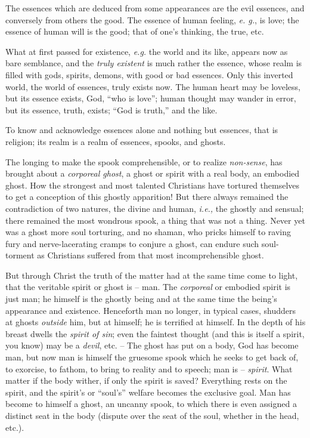 The essences which are deduced from some appearances are the evil essences, 
and conversely from others the good. The essence of human feeling, \textit{e. 
g.}, is love; the essence of human will is the good; that of one's thinking, 
the true, etc.

What at first passed for existence, \textit{e.g.} the world and its like, 
appears now as bare semblance, and the \textit{truly existent} is much rather 
the essence, whose realm is filled with gods, spirits, demons, with good or 
bad essences. Only this inverted world, the world of essences, truly exists 
now. The human heart may be loveless, but its essence exists, God, ``who is 
love''; human thought may wander in error, but its essence, truth, exists; 
``God is truth,'' and the like.

To know and acknowledge essences alone and nothing but essences, that is 
religion; its realm is a realm of essences, spooks, and ghosts.

The longing to make the spook comprehensible, or to realize 
\textit{non-sense}, has brought about a \textit{corporeal ghost}, a ghost or 
spirit with a real body, an embodied ghost. How the strongest and most 
talented Christians have tortured themselves to get a conception of this 
ghostly apparition! But there always remained the contradiction of two 
natures, the divine and human, \textit{i.e.,} the ghostly and sensual; there 
remained the most wondrous spook, a thing that was not a thing. Never yet was 
a ghost more soul torturing, and no shaman, who pricks himself to raving fury 
and nerve-lacerating cramps to conjure a ghost, can endure such soul-torment 
as Christians suffered from that most incomprehensible ghost.

But through Christ the truth of the matter had at the same time come to light, 
that the veritable spirit or ghost is -- man. The \textit{corporeal} or 
embodied spirit is just man; he himself is the ghostly being and at the same 
time the being's appearance and existence. Henceforth man no longer, in 
typical cases, shudders at ghosts \textit{outside} him, but at himself; he is 
terrified at himself. In the depth of his breast dwells the \textit{spirit of 
sin}; even the faintest thought (and this is itself a spirit, you know) may be 
a \textit{devil}, etc. -- The ghost has put on a body, God has become man, but 
now man is himself the gruesome spook which he seeks to get back of, to 
exorcise, to fathom, to bring to reality and to speech; man is -- 
\textit{spirit}. What matter if the body wither, if only the spirit is saved? 
Everything rests on the spirit, and the spirit's or ``soul's'' welfare 
becomes the exclusive goal. Man has become to himself a ghost, an uncanny 
spook, to which there is even assigned a distinct seat in the body (dispute 
over the seat of the soul, whether in the head, etc.).

